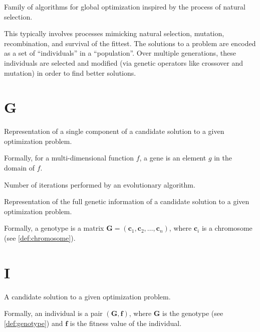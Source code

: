     \begin{definition}
    \label{def:evolutionary_computation}
      Family of algorithms for global optimization inspired by the process of natural selection.

      This typically involves processes mimicking natural selection, mutation, recombination, and 
      survival of the fittest. 
      The solutions to a problem are encoded as a set of \enquote{individuals} in a 
      \enquote{population}. 
      Over multiple generations, these individuals are selected and modified (via genetic operators 
      like crossover and mutation) in order to find better solutions.
    \end{definition}
    
  \section*{G}
    \begin{definition}[Gene]
    \label{def:gene}
      Representation of a single component of a candidate solution to a given optimization problem.

      Formally, for a multi-dimensional function \(f\), a gene is an element \(g\) in the domain of
      \(f\).
    \end{definition}

    \begin{definition}[Generation]
    \label{def:generation}
      Number of iterations performed by an evolutionary algorithm.
    \end{definition}

    \begin{definition}[Genotype]
    \label{def:genotype}
      Representation of the full genetic information of a candidate solution to a given optimization
      problem.

      Formally, a genotype is a matrix \(\mathbf{G} = (\textbf{c}_1, \textbf{c}_2, \dots, 
      \textbf{c}_n)\), where \(\textbf{c}_i\) is a chromosome (see \vref{def:chromosome}).
    \end{definition}

  \section*{I}
    \begin{definition}[Individual]
    \label{def:individual}
      A candidate solution to a given optimization problem.

      Formally, an individual is a pair \((\mathbf{G}, \mathbf{f})\), where \(\mathbf{G}\) is the
      genotype (see \vref{def:genotype}) and \(\mathbf{f}\) is the fitness value of the
      individual.
    \end{definition}

